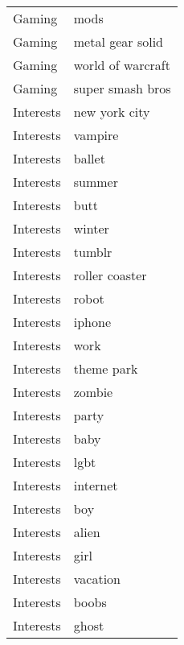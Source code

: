\begin{supertabular}{l p{0.25\textwidth}}
           Gaming &                               mods \\
           Gaming &                   metal gear solid \\
           Gaming &                  world of warcraft \\
           Gaming &                   super smash bros \\
        Interests &                      new york city \\
        Interests &                            vampire \\
        Interests &                             ballet \\
        Interests &                             summer \\
        Interests &                               butt \\
        Interests &                             winter \\
        Interests &                             tumblr \\
        Interests &                     roller coaster \\
        Interests &                              robot \\
        Interests &                             iphone \\
        Interests &                               work \\
        Interests &                         theme park \\
        Interests &                             zombie \\
        Interests &                              party \\
        Interests &                               baby \\
        Interests &                               lgbt \\
        Interests &                           internet \\
        Interests &                                boy \\
        Interests &                              alien \\
        Interests &                               girl \\
        Interests &                           vacation \\
        Interests &                              boobs \\
        Interests &                              ghost \\

\end{supertabular}
